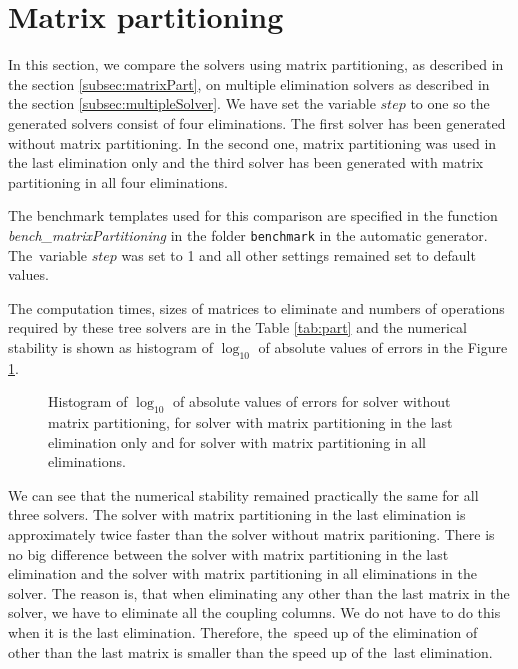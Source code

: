 \section{Matrix partitioning}
\label{exp:part}
In this section, we compare the solvers using matrix partitioning, as described in the section \ref{subsec:matrixPart}, on multiple elimination solvers as described in the section \ref{subsec:multipleSolver}. We have set the variable $step$ to one so the generated solvers consist of four eliminations. The first solver has been generated without matrix partitioning. In the second one, matrix partitioning was used in the last elimination only and the third solver has been generated with matrix partitioning in all four eliminations.

The benchmark templates used for this comparison are specified in the function \textit{bench\_\-mat\-rix\-Partitioning} in the folder \texttt{benchmark} in the automatic generator. The~variable $step$ was set to 1 and all other settings remained set to default values.

The computation times, sizes of matrices to eliminate and numbers of operations required by these tree solvers are in the Table \ref{tab:part} and the numerical stability is shown as histogram of $\log_{10}$ of absolute values of errors in the Figure \ref{graph:part}.

\begin{figure}[ht]
  \centering
  \resizebox{0.95\textwidth}{!}{}
  \caption{Histogram of $\log_{10}$ of absolute values of errors for solver without matrix partitioning, for solver with matrix partitioning in the last elimination only and for solver with matrix partitioning in all eliminations.}
  \label{graph:part}
\end{figure}

We can see that the numerical stability remained practically the same for all three solvers. The solver with matrix partitioning in the last elimination is approximately twice faster than the solver without matrix paritioning. There is no big difference between the solver with matrix partitioning in the last elimination and the solver with matrix partitioning in all eliminations in the solver. The reason is, that when eliminating any other than the last matrix in the solver, we have to eliminate all the coupling columns. We do not have to do this when it is the last elimination. Therefore, the~speed up of the elimination of other than the last matrix is smaller than the speed up of the~last elimination.

